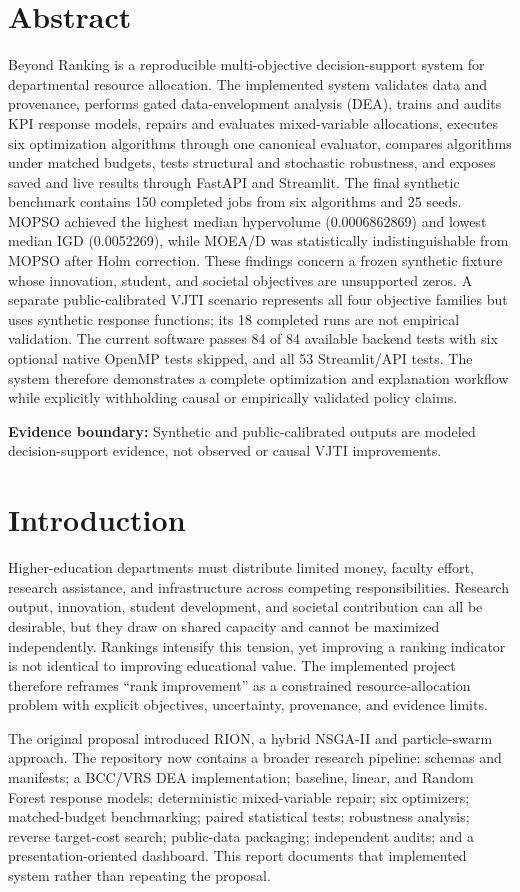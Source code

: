 \documentclass[12pt,a4paper]{report}
\newcommand{\evidencewarning}{\begin{center}\small\textbf{Evidence boundary:} Synthetic and public-calibrated outputs are modeled decision-support evidence, not observed or causal VJTI improvements.\end{center}}
\begin{document}
\chapter*{Abstract}
Beyond Ranking is a reproducible multi-objective decision-support system for departmental resource allocation. The implemented system validates data and provenance, performs gated data-envelopment analysis (DEA), trains and audits KPI response models, repairs and evaluates mixed-variable allocations, executes six optimization algorithms through one canonical evaluator, compares algorithms under matched budgets, tests structural and stochastic robustness, and exposes saved and live results through FastAPI and Streamlit. The final synthetic benchmark contains 150 completed jobs from six algorithms and 25 seeds. MOPSO achieved the highest median hypervolume (0.0006862869) and lowest median IGD (0.0052269), while MOEA/D was statistically indistinguishable from MOPSO after Holm correction. These findings concern a frozen synthetic fixture whose innovation, student, and societal objectives are unsupported zeros. A separate public-calibrated VJTI scenario represents all four objective families but uses synthetic response functions; its 18 completed runs are not empirical validation. The current software passes 84 of 84 available backend tests with six optional native OpenMP tests skipped, and all 53 Streamlit/API tests. The system therefore demonstrates a complete optimization and explanation workflow while explicitly withholding causal or empirically validated policy claims.
\evidencewarning

\clearpage{}
\chapter{Introduction}
Higher-education departments must distribute limited money, faculty effort, research assistance, and infrastructure across competing responsibilities. Research output, innovation, student development, and societal contribution can all be desirable, but they draw on shared capacity and cannot be maximized independently. Rankings intensify this tension, yet improving a ranking indicator is not identical to improving educational value. The implemented project therefore reframes ``rank improvement'' as a constrained resource-allocation problem with explicit objectives, uncertainty, provenance, and evidence limits.

The original proposal introduced RION, a hybrid NSGA-II and particle-swarm approach. The repository now contains a broader research pipeline: schemas and manifests; a BCC/VRS DEA implementation; baseline, linear, and Random Forest response models; deterministic mixed-variable repair; six optimizers; matched-budget benchmarking; paired statistical tests; robustness analysis; reverse target-cost search; public-data packaging; independent audits; and a presentation-oriented dashboard. This report documents that implemented system rather than repeating the proposal.
\end{document}
